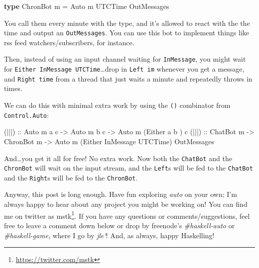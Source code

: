 \documentclass[]{article}
\newenvironment{Shaded}{}{}
\newcommand{\KeywordTok}[1]{\textcolor[rgb]{0.00,0.44,0.13}{\textbf{{#1}}}}
\newcommand{\DataTypeTok}[1]{\textcolor[rgb]{0.56,0.13,0.00}{{#1}}}
\newcommand{\OtherTok}[1]{\textcolor[rgb]{0.00,0.44,0.13}{{#1}}}
\newcommand{\FunctionTok}[1]{\textcolor[rgb]{0.02,0.16,0.49}{{#1}}}
\newcommand{\NormalTok}[1]{{#1}}
\renewcommand{\href}[2]{#2\footnote{\url{#1}}}
\begin{document}
\begin{Shaded}
\begin{Highlighting}[]
\KeywordTok{type} \DataTypeTok{ChronBot} \NormalTok{m }\FunctionTok{=} \DataTypeTok{Auto} \NormalTok{m }\DataTypeTok{UTCTime} \DataTypeTok{OutMessages}
\end{Highlighting}
\end{Shaded}

You call them every minute with the type, and it's allowed to react with the the
time and output an \texttt{OutMessages}. You can use this bot to implement
things like rss feed watchers/subscribers, for instance.

Then, instead of using an input channel waiting for \texttt{InMessage}, you
might wait for \texttt{Either\ InMessage\ UTCTime}\ldots{}drop in
\texttt{Left\ im} whenever you get a message, and \texttt{Right\ time} from a
thread that just waits a minute and repeatedly throws in times.

We can do this with minimal extra work by using the
\texttt{(\textbar{}\textbar{}\textbar{})} combinator from \texttt{Control.Auto}:

\begin{Shaded}
\begin{Highlighting}[]
\OtherTok{(|||) ::} \DataTypeTok{Auto} \NormalTok{m a c }\OtherTok{->} \DataTypeTok{Auto} \NormalTok{m b c }\OtherTok{->} \DataTypeTok{Auto} \NormalTok{m (}\DataTypeTok{Either} \NormalTok{a         b      ) c}
\OtherTok{(|||) ::} \DataTypeTok{ChatBot} \NormalTok{m  }\OtherTok{->} \DataTypeTok{ChronBot} \NormalTok{m }\OtherTok{->} \DataTypeTok{Auto} \NormalTok{m (}\DataTypeTok{Either} \DataTypeTok{InMessage} \DataTypeTok{UTCTime}\NormalTok{) }\DataTypeTok{OutMessages}
\end{Highlighting}
\end{Shaded}

And\ldots{}you get it all for free! No extra work. Now both the \texttt{ChatBot}
and the \texttt{ChronBot} will wait on the input stream, and the \texttt{Left}s
will be fed to the \texttt{ChatBot} and the \texttt{Right}s will be fed to the
\texttt{ChronBot}.

Anyway, this post is long enough. Have fun exploring \emph{auto} on your own;
I'm always happy to hear about any project you might be working on! You can find
me on twitter as \href{https://twitter.com/mstk}{mstk}. If you have any
questions or comments/suggestions, feel free to leave a comment down below or
drop by freenode's \emph{\#haskell-auto} or \emph{\#haskell-game}, where I go by
\emph{jle`}! And, as always, happy Haskelling!
\end{document}

